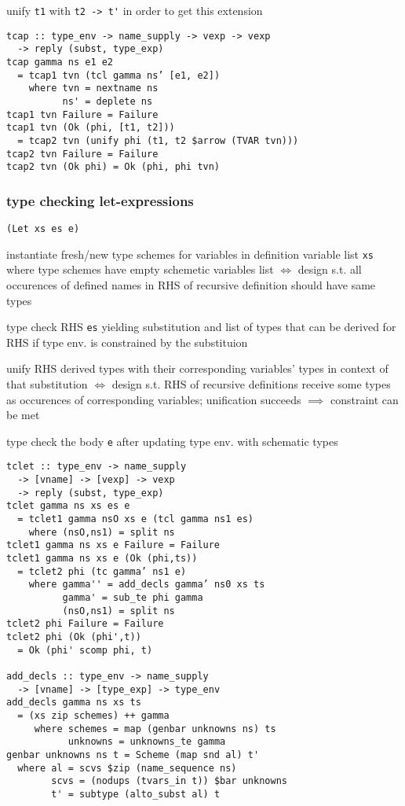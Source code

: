 \documentclass[8pt]{extarticle}
\begin{document}
\begin{multicols*}{2}
unify \verb|t1| with \verb|t2 -> t'| in order to get this extension

\begin{verbatim}
tcap :: type_env -> name_supply -> vexp -> vexp
  -> reply (subst, type_exp)
tcap gamma ns e1 e2
  = tcap1 tvn (tcl gamma ns’ [e1, e2])
    where tvn = nextname ns
          ns' = deplete ns
tcap1 tvn Failure = Failure
tcap1 tvn (Ok (phi, [t1, t2]))
  = tcap2 tvn (unify phi (t1, t2 $arrow (TVAR tvn)))
tcap2 tvn Failure = Failure
tcap2 tvn (Ok phi) = Ok (phi, phi tvn)
\end{verbatim}

\vfill\null
\columnbreak

\subsubsection{type checking let-expressions}

\verb|(Let xs es e)|

instantiate fresh/new type schemes for variables in definition variable list \verb|xs| where type schemes have empty schemetic variables list $\iff$ design s.t. all occurences of defined names in RHS of recursive definition should have same types

type check RHS \verb|es| yielding substitution and list of types that can be derived for RHS if type env. is constrained by the substituion

unify RHS derived types with their corresponding variables' types in context of that substitution $\iff$ design s.t. RHS of recursive definitions receive some types as occurences of corresponding variables; unification succeeds $\implies$ constraint can be met

type check the body \verb|e| after updating type env. with schematic types

\begin{verbatim}
tclet :: type_env -> name_supply
  -> [vname] -> [vexp] -> vexp
  -> reply (subst, type_exp)
tclet gamma ns xs es e
  = tclet1 gamma nsO xs e (tcl gamma ns1 es)
    where (nsO,ns1) = split ns
tclet1 gamma ns xs e Failure = Failure
tclet1 gamma ns xs e (Ok (phi,ts))
  = tclet2 phi (tc gamma’ ns1 e)
    where gamma'' = add_decls gamma’ ns0 xs ts
          gamma' = sub_te phi gamma
          (nsO,ns1) = split ns
tclet2 phi Failure = Failure
tclet2 phi (Ok (phi',t))
  = Ok (phi' scomp phi, t)

add_decls :: type_env -> name_supply
  -> [vname] -> [type_exp] -> type_env
add_decls gamma ns xs ts
  = (xs zip schemes) ++ gamma
     where schemes = map (genbar unknowns ns) ts
           unknowns = unknowns_te gamma
genbar unknowns ns t = Scheme (map snd al) t'
  where al = scvs $zip (name_sequence ns)
        scvs = (nodups (tvars_in t)) $bar unknowns
        t' = subtype (alto_subst al) t


\end{verbatim}
\end{multicols*}
\end{document}
